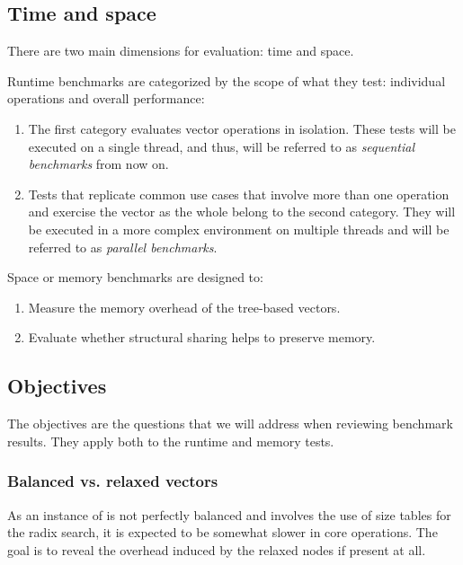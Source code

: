 
\subsection{Time and space}
There are two main dimensions for evaluation: time and space.

Runtime benchmarks are categorized by the scope of what they test: individual operations and overall performance:
\begin{enumerate}
    \item The first category evaluates vector operations in isolation. These tests will be executed on a single thread, and thus, will be referred to as \emph{sequential benchmarks} from now on.
    \item Tests that replicate common use cases that involve more than one operation and exercise the vector as the whole belong to the second category. They will be executed in a more complex environment on multiple threads and will be referred to as \emph{parallel benchmarks}.
\end{enumerate}

Space or memory benchmarks are designed to:
\begin{enumerate}
    \item Measure the memory overhead of the tree-based vectors.
    \item Evaluate whether structural sharing helps to preserve memory.
\end{enumerate}

\subsection{Objectives}
The objectives are the questions that we will address when reviewing benchmark results. They apply both to the runtime and memory tests.

\subsubsection*{Balanced vs. relaxed vectors}
As an instance of \rrbtree{} is not perfectly balanced and involves the use of size tables for the radix search, it is expected to be somewhat slower in core operations. The goal is to reveal the overhead induced by the relaxed nodes if present at all.

